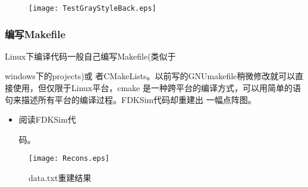 \documentclass{beamer}
\begin{document}
\begin{CJK*}{UTF8}{gkai}
\begin{frame}
\begin{minipage}[t]{0.5\textwidth}
\begin{figure}[ht]
	\texttt{[image: TestGrayStyleBack.eps]}
      \end{figure}
    \end{minipage}
  \end{frame}
  \begin{frame}\frametitle{编写Makefile}
    \begin{minipage}[t]{0.3\textwidth}
      \liuhao
      Linux下编译代码一般自己编写Makefile(类似于
      
      windows下的projects)或
      者CMakeLists。以前写的GNUmakefile稍微修改就可以直接使用，但仅限于Linux平台，cmake
      是一种跨平台的编译方式，可以用简单的语句来描述所有平台的编译过程。FDKSim代码却重建出
      一幅点阵图。
      \begin{itemize}
	\item 阅读FDKSim代
	  
	  码。
      \end{itemize}
    \end{minipage}
    \begin{minipage}[t]{0.7\textwidth}
      \begin{figure}[ht]
        \texttt{[image: Recons.eps]}
	\caption{\liuhao data.txt重建结果} 
      \end{figure}
    \end{minipage}
  \end{frame}
  \ThankYouPage
\end{CJK*}
\end{document}
